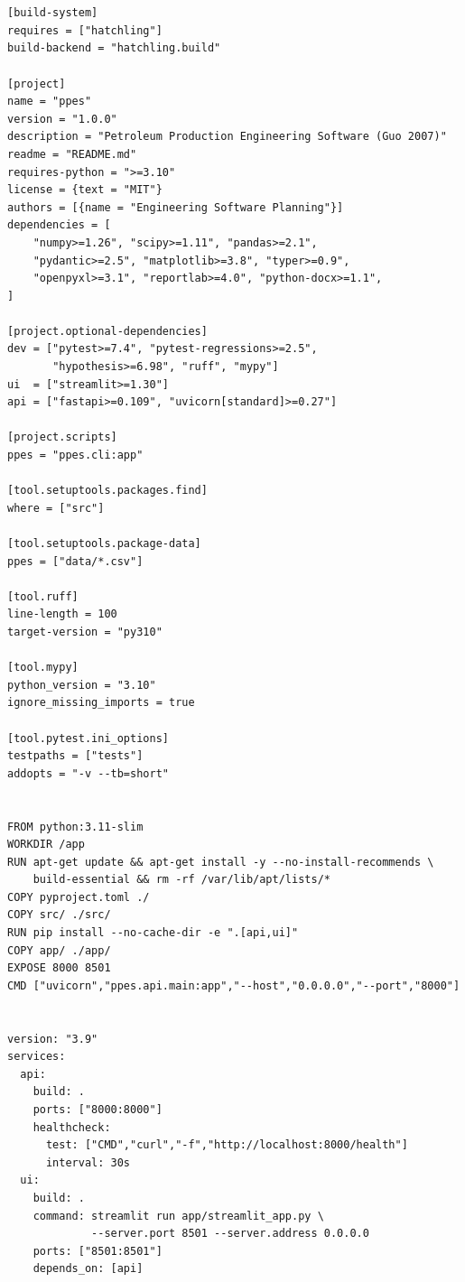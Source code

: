 \documentclass[10pt,a4paper,openany]{book}
\begin{document}
\chapter{}
\begin{lstlisting}[style=plain]
[build-system]
requires = ["hatchling"]
build-backend = "hatchling.build"

[project]
name = "ppes"
version = "1.0.0"
description = "Petroleum Production Engineering Software (Guo 2007)"
readme = "README.md"
requires-python = ">=3.10"
license = {text = "MIT"}
authors = [{name = "Engineering Software Planning"}]
dependencies = [
    "numpy>=1.26", "scipy>=1.11", "pandas>=2.1",
    "pydantic>=2.5", "matplotlib>=3.8", "typer>=0.9",
    "openpyxl>=3.1", "reportlab>=4.0", "python-docx>=1.1",
]

[project.optional-dependencies]
dev = ["pytest>=7.4", "pytest-regressions>=2.5",
       "hypothesis>=6.98", "ruff", "mypy"]
ui  = ["streamlit>=1.30"]
api = ["fastapi>=0.109", "uvicorn[standard]>=0.27"]

[project.scripts]
ppes = "ppes.cli:app"

[tool.setuptools.packages.find]
where = ["src"]

[tool.setuptools.package-data]
ppes = ["data/*.csv"]

[tool.ruff]
line-length = 100
target-version = "py310"

[tool.mypy]
python_version = "3.10"
ignore_missing_imports = true

[tool.pytest.ini_options]
testpaths = ["tests"]
addopts = "-v --tb=short"
\end{lstlisting}

\chapter{}
\begin{lstlisting}[style=plain]
FROM python:3.11-slim
WORKDIR /app
RUN apt-get update && apt-get install -y --no-install-recommends \
    build-essential && rm -rf /var/lib/apt/lists/*
COPY pyproject.toml ./
COPY src/ ./src/
RUN pip install --no-cache-dir -e ".[api,ui]"
COPY app/ ./app/
EXPOSE 8000 8501
CMD ["uvicorn","ppes.api.main:app","--host","0.0.0.0","--port","8000"]
\end{lstlisting}

\chapter{}
\begin{lstlisting}[style=plain]
version: "3.9"
services:
  api:
    build: .
    ports: ["8000:8000"]
    healthcheck:
      test: ["CMD","curl","-f","http://localhost:8000/health"]
      interval: 30s
  ui:
    build: .
    command: streamlit run app/streamlit_app.py \
             --server.port 8501 --server.address 0.0.0.0
    ports: ["8501:8501"]
    depends_on: [api]
\end{lstlisting}
\end{document}
